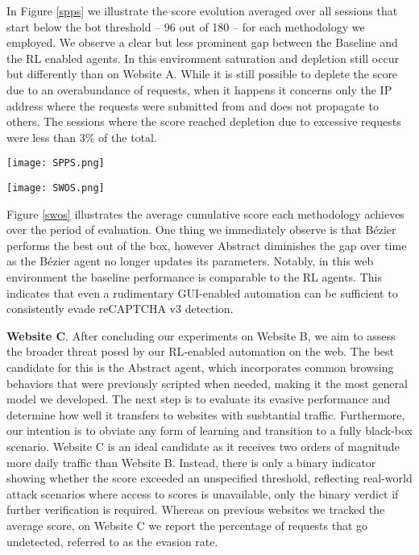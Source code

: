 In Figure \ref{spps} we illustrate the score evolution averaged over all sessions that start below the bot threshold -- 96 out of 180 -- for each methodology we employed.
We observe a clear but less prominent gap between the Baseline and the \gls{RL} enabled agents.
In this environment saturation and depletion still occur but differently than on Website A.
While it is still possible to deplete the score due to an overabundance of requests, when it happens it concerns only the IP address where the requests were submitted from and does not propagate to others.
The sessions where the score reached depletion due to excessive requests were less than 3\% of the total.

\begin{figure*}[ht!]
  \centerline{\texttt{[image: SPPS.png]}}
  \caption[reCaptcha score evolution in sessions initially flagged as bot]{Score evolution in sessions initially flagged as bot, on Website A and Website B.}
  \label{spps}
  \end{figure*}

\begin{figure*}[ht!]
\centerline{\texttt{[image: SWOS.png]}}
\caption[Average cumulative score over the period of evaluation.]{Average cumulative score over the period of evaluation, for Website A and Website B.}
\label{swos}
\end{figure*}

Figure \ref{swos} illustrates the average cumulative score each methodology achieves over the period of evaluation.
One thing we immediately observe is that Bézier performs the best out of the box, however Abstract diminishes the gap over time as the Bézier agent no longer updates its parameters.
Notably, in this web environment the baseline performance is comparable to the \gls{RL} agents.
This indicates that even a rudimentary GUI-enabled automation can be sufficient to consistently evade reCAPTCHA v3 detection.

\textbf{Website C}. After concluding our experiments on Website B, we aim to assess the broader threat posed by our \gls{RL}-enabled automation on the web.
The best candidate for this is the Abstract agent, which incorporates common browsing behaviors that were previously scripted when needed, making it the most general model we developed.
The next step is to evaluate its evasive performance and determine how well it transfers to websites with susbtantial traffic.
Furthermore, our intention is to obviate any form of learning and transition to a fully black-box scenario.
Website C is an ideal candidate as it receives two orders of magnitude more daily traffic than Website B.
Instead, there is only a binary indicator showing whether the score exceeded an unspecified threshold, reflecting real-world attack scenarios where access to scores is unavailable, only the binary verdict if further verification is required.
Whereas on previous websites we tracked the average score, on Website C we report the percentage of requests that go undetected, referred to as the evasion rate.

